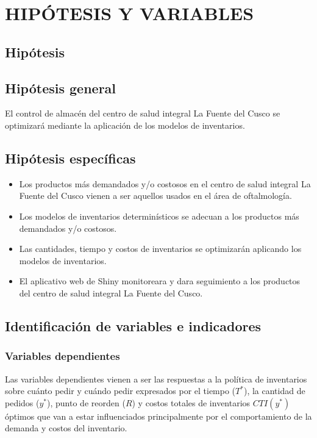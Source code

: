 \newpage
\chapter{HIPÓTESIS Y VARIABLES}
\section{Hipótesis}

\section{Hipótesis general}
El control de almacén del centro de salud integral La Fuente del Cusco se optimizará mediante la aplicación de los modelos de inventarios.

\section{Hipótesis específicas}

\begin{itemize}
\item Los productos más demandados y/o costosos en el centro de salud integral La Fuente del Cusco vienen a ser aquellos usados en el área de oftalmología.
\item Los modelos de inventarios determinísticos se adecuan a los productos más demandados y/o costosos.
\item Las cantidades, tiempo y costos de inventarios se optimizarán aplicando los modelos de inventarios.
\item El aplicativo web de Shiny monitoreara y dara seguimiento a los productos del centro de salud integral La Fuente del Cusco.
\end{itemize}

\section{Identificación de variables e indicadores}
\subsection{Variables dependientes}
Las variables dependientes vienen a ser las respuestas a la política de inventarios sobre cuánto pedir y cuándo pedir expresados por el tiempo ($T^*$), la cantidad de pedidos ($y^*$), punto de reorden ($R$) y costos totales de inventarios $CTI(y^*)$ óptimos que van a estar influenciados principalmente por el comportamiento de la demanda y costos del inventario.
\clearpage
